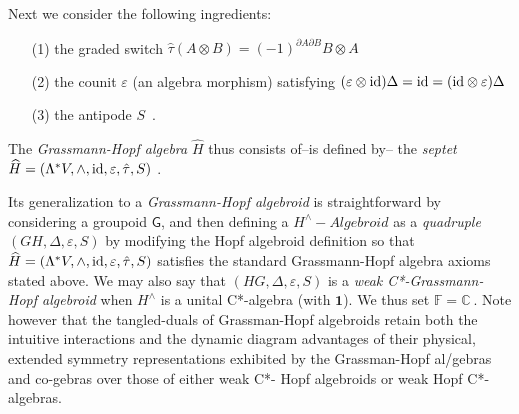 \documentclass[12pt]{article}
\theoremstyle{plain}
\theoremstyle{definition}
\numberwithin{equation}{section}
\newcommand{\ID}{{\rm id}}
\newcommand{\vep}{\varepsilon}
\newcommand{\grp}{{\mathsf{G}}}
\newcommand{\del}{\partial}
\newcommand{\<}{{\langle}}
\begin{document}
Next we consider the following ingredients:

\begin{itemize}
\item[(1)]
the graded switch $\hat{\tau} (A \otimes B) = (-1)^{\del
A \del B} B \otimes A$
\item[(2)]
the counit $\varepsilon$ (an algebra morphism) satisfying
$(\varepsilon \otimes \ID) \Delta = \ID = (\ID \otimes
\varepsilon) \Delta$


\item[(3)] the antipode $S$~.
\end{itemize}

The \textit{Grassmann-Hopf algebra} $\widehat{H}$ thus consists of--is defined by-- the
\textit{septet} $\widehat{H}=(\Lambda^*V, \wedge, \ID, \varepsilon, \hat{\tau},S)~$.

Its generalization to a \textit{Grassmann-Hopf algebroid} is
straightforward by considering a groupoid $\grp$, and then
defining a $H^{\wedge}- \textit{Algebroid}$ as a
\textit{quadruple} $(GH, \Delta, \vep, S)$ by modifying the Hopf
algebroid definition so that 
$\widehat{H} = (\Lambda^*V, \wedge, \ID, \varepsilon, \hat{\tau},S)$ satisfies the standard
Grassmann-Hopf algebra axioms stated above. We may also say that
$(HG, \Delta, \vep, S)$ is a \emph{weak C*-Grassmann-Hopf
algebroid} when $H^{\wedge}$ is a unital C*-algebra (with $\mathbf 1$).  
We thus set $\mathbb F = \mathbb C~$. Note however
that the tangled-duals of Grassman-Hopf algebroids retain both the
intuitive interactions and the dynamic diagram advantages of their
physical, extended symmetry representations exhibited by the
Grassman-Hopf al/gebras and co-gebras over those of either weak
C*- Hopf algebroids or weak Hopf C*- algebras.
\end{document}
